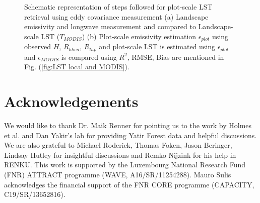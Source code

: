 \documentclass[fleqn,10pt]{wlscirep}
\begin{document}
\begin{figure}[H]
\begin{subfigure}{.5\textwidth}
{}
\end{subfigure}
\caption{Schematic representation of steps followed for plot-scale LST retrieval using eddy covariance measurement (a) Landscape emissivity and longwave measurement and compared to Landscape-scale LST ($T_{MODIS}$) (b) Plot-scale emissivity estimation $\epsilon_{plot}$ using observed $H$, $R_{ldwn}$, $R_{lup}$ and plot-scale LST is estimated using $\epsilon_{plot}$ and $\epsilon_{MODIS}$ is compared using $R^{2}$, RMSE, Bias are mentioned in Fig. (\ref{fig:LST local and MODIS}).}
\label{fig:flow_chart}
\end{figure}
\section{Acknowledgements}
We would like to thank Dr. Maik Renner for pointing us to the work by Holmes et al. and Dan Yakir's lab for providing Yatir Forest data and helpful discussions. We are also grateful to Michael Roderick, Thomas Foken, Jason Beringer, Lindsay Hutley for insightful discussions and Remko Nijzink for his help in RENKU. This work is supported by the Luxembourg National Research Fund (FNR) ATTRACT programme (WAVE, A16/SR/11254288). Mauro Sulis acknowledges the financial support of the FNR CORE programme (CAPACITY, C19/SR/13652816).


%



%
\end{document}

